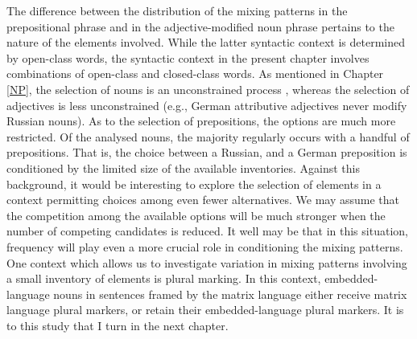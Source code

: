 The difference between the distribution of the mixing patterns in the prepositional phrase and in the adjective-modified noun phrase pertains to the nature of the elements involved. While the latter syntactic context is determined by open-class words, the syntactic context in the present chapter involves combinations of open-class and closed-class words. As mentioned in Chapter \ref{NP}, the selection of nouns is an unconstrained process \citep{boumans-syntax-1998}, whereas the selection of adjectives is less unconstrained (e.g., German attributive adjectives never modify Russian nouns). As to the selection of  prepositions, the options are much more restricted. Of the analysed nouns, the majority regularly occurs with a handful of prepositions. That is, the choice between a Russian, and a German preposition is conditioned by the limited size of the available inventories. Against this background, it would be interesting to explore the selection of elements in a context permitting choices among even fewer alternatives. We may assume that the competition among the available options will be much stronger when the number of competing candidates is reduced. It well may be that in this situation, frequency will play even a more crucial role in conditioning the mixing patterns. One context which allows us to investigate variation in mixing patterns involving a small inventory of elements is plural marking. In this context, embedded-language nouns in sentences framed by the matrix language either receive matrix language plural markers, or retain their embedded-language plural markers. It is to this study that I turn in the next chapter.
